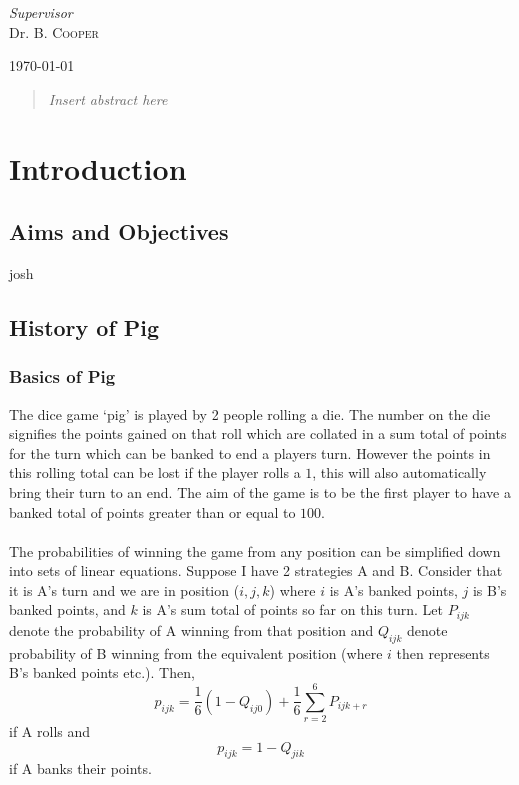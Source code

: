 \documentclass[a4paper,titlepage]{article}
\begin{document}
\begin{titlepage}
	\vfill\vfill
	\textit{Supervisor}\\
	Dr. B. \textsc{Cooper}


	\vfill\vfill\vfill

	{\large\today}
	\vfill


	\newpage
	\begin{abstract}
	\textit{Insert abstract here}
	\end{abstract}
\end{titlepage}


\tableofcontents
\newpage

\section{Introduction}
\subsection{Aims and Objectives}
josh
\subsection{History of Pig}
\subsubsection{Basics of Pig}
The dice game `pig' is played by 2 people rolling a die. The number on the die signifies the points gained on that roll which are collated in a sum total of points for the turn which can be banked to end a players turn. However the points in this rolling total can be lost if the player rolls a $1$, this will also automatically bring their turn to an end. The aim of the game is to be the first player to have a banked total of points greater than or equal to $100$.
\\
\\
The probabilities of winning the game from any position can be simplified down into sets of linear equations. Suppose I have 2 strategies A and B. Consider that it is A's turn and we are in position ($i,j,k$) where $i$ is A's banked points, $j$ is B's banked points, and $k$ is A's sum total of points so far on this turn. Let $P_{ijk}$ denote the probability of A winning from that position and $Q_{ijk}$ denote probability of B winning from the equivalent position (where $i$ then represents B's banked points etc.). Then, \begin{equation}\label{1.2.1.a}
p_{ijk} = \dfrac{1}{6} (1-Q_{ij0}) + \dfrac{1}{6}\sum^{6}_{r=2}P_{ijk+r}
\end{equation}
 if A rolls and
 \begin{equation}\label{1.2.1.b}
 p_{ijk} = 1-Q_{jik}
 \end{equation} 
 if A banks their points.
\end{document}
